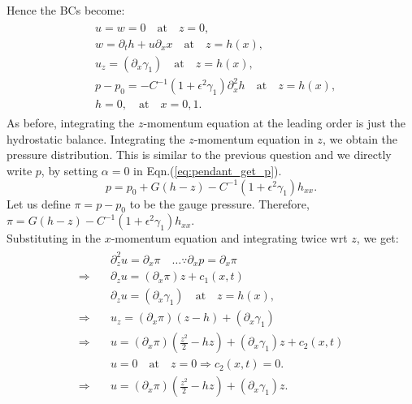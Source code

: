 \documentclass{article}
\begin{document}
Hence the BCs become:
\begin{align}\label{eq:marangoni_bcs_dimless}
 \begin{split}
  & u = w = 0 \quad \textrm{at} \quad z = 0,\\
  & w = \partial_{t}h + u \partial_{x} x \quad \textrm{at} \quad z = h(x),\\
  & u_{z} = (\partial_{x}\gamma_{1}) \quad \textrm{at} \quad z = h(x),\\
  & p - p_{0} = -C^{-1} (1 + \epsilon^{2}\gamma_{1})\partial_{x}^{2}h \quad \textrm{at} \quad z = h(x),\\
  & h = 0, \quad \textrm{at} \quad x = 0, 1.
 \end{split}
\end{align}
As before, integrating the $z$-momentum equation at the leading order is just the hydrostatic balance. Integrating the $z$-momentum equation in $z$, we obtain the pressure distribution. This is similar to the previous question and we directly write $p$, by setting $\alpha = 0$ in Eqn.(\ref{eq:pendant_get_p}). 
\begin{equation}\label{eq:marangoni_p}
 p = p_{0} + G(h-z) - C^{-1}(1 + \epsilon^{2}\gamma_{1})h_{xx}.
\end{equation}
Let us define $\pi = p - p_{0}$ to be the gauge pressure. Therefore, $\pi = G(h-z) -  C^{-1}(1 + \epsilon^{2}\gamma_{1})h_{xx}$.\\
Substituting in the $x$-momentum equation and integrating twice wrt $z$, we get:
\begin{align}\label{eq:marangoni_u}
 \begin{split}
  & \partial^{2}_{z}u = \partial_{x}\pi \quad  \hdots \because \partial_{x}p = \partial_{x}\pi \\
  \Rightarrow \quad & \partial_{z}u = (\partial_{x}\pi)z + c_{1}(x, t)\\
  & \partial_{z} u = (\partial_{x}\gamma_{1}) \quad \textrm{at} \quad z = h(x),\\
  \Rightarrow \quad & u_{z} = (\partial_{x}\pi)(z-h) + (\partial_{x}\gamma_{1})\\
  \Rightarrow \quad & u =  (\partial_{x}\pi)\left(\frac{z^{2}}{2}-hz\right) + (\partial_{x}\gamma_{1})z + c_{2}(x, t)\\
  & u = 0 \quad \textrm{at} \quad z = 0 \Rightarrow c_{2}(x, t) = 0.\\
  \Rightarrow \quad & \boxed{ u =  (\partial_{x}\pi)\left(\frac{z^{2}}{2}-hz\right) + (\partial_{x}\gamma_{1})z }.
 \end{split}
\end{align}
\end{document}
